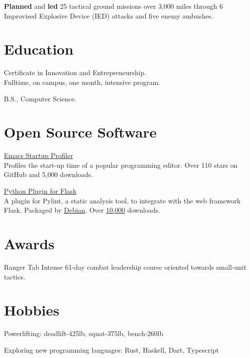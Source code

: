 \documentclass[letterpaper,11pt]{jschaf-resume}
\newcommand*{\action}[1]{\textbf{#1}}
\begin{document}
\begin{paracol}{2}
\begin{workitems}
\item \action{Planned} and \action{led} 25 tactical ground missions over 3,000 miles through 6
  Improvised Explosive Device (IED) attacks and five enemy ambushes.
\end{workitems}

\section*{Education}

Certificate in Innovation and Entrepreneurship.\\
Fulltime, on campus, one month, intensive program.

B.S., Computer Science.

\switchcolumn

\section*{Open Source Software}

\href{https://github.com/jschaf/esup}{Emacs Startup Profiler}\\
Profiles the start-up time of a popular programming editor.  Over 110 stars on
GitHub and 5,000 downloads.

\href{https://github.com/jschaf/pylint-flask}{Python Plugin for Flask}\\
A plugin for Pylint, a static analysis tool, to integrate with the web framework
Flask.  Packaged by
\href{https://packages.debian.org/sid/main/python3-pylint-flask}{Debian}.  Over
\href{http://pypi-ranking.info/module/pylint-flask}{10,000} downloads.


\section*{Awards}
Ranger Tab Intense 61-day combat leadership course oriented towards small-unit
tactics.


\section*{Hobbies}
Powerlifting: deadlift-425lb, squat-375lb, bench-260lb

Exploring new programming languages: Rust, Haskell, Dart, Typescript

\end{paracol}

\end{document}
